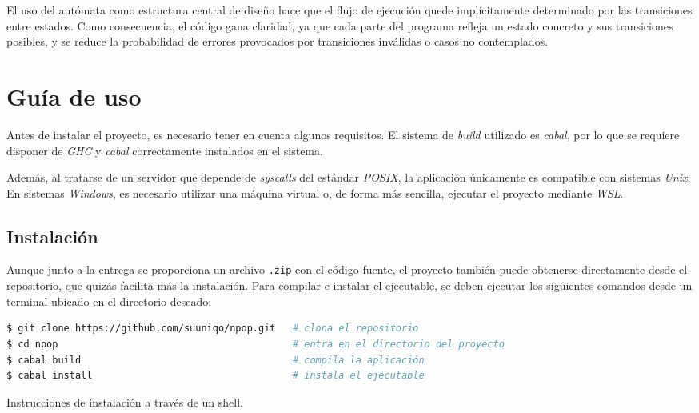 \documentclass[a4paper]{CSMakotoTechnicalReport}
\begin{document}
\vspace{10pt}

El uso del autómata como estructura central de diseño hace que el flujo de ejecución quede implícitamente determinado por las transiciones entre estados. Como consecuencia, el código gana claridad, ya que cada parte del programa refleja un estado concreto y sus transiciones posibles, y se reduce la probabilidad de errores provocados por transiciones inválidas o casos no contemplados.


\section{Guía de uso}

Antes de instalar el proyecto, es necesario tener en cuenta algunos requisitos. El sistema de \textit{build} utilizado es \textit{cabal}, por lo que se requiere disponer de \textit{GHC} y \textit{cabal} correctamente instalados en el sistema.

Además, al tratarse de un servidor que depende de \textit{syscalls} del estándar \textit{POSIX}, la aplicación únicamente es compatible con sistemas \textit{Unix}. En sistemas \textit{Windows}, es necesario utilizar una máquina virtual o, de forma más sencilla, ejecutar el proyecto mediante \textit{WSL}.


\subsection{Instalación}

Aunque junto a la entrega se proporciona un archivo \texttt{.zip} con el código fuente, el proyecto también puede obtenerse directamente desde el repositorio, que quizás facilita más la instalación. Para compilar e instalar el ejecutable, se deben ejecutar los siguientes comandos desde un terminal ubicado en el directorio deseado:

\vspace{-6pt}
\begin{minipage}{\linewidth}
\begin{lstlisting}[language=bash, numbers=none, basicstyle=\small]
$ git clone https://github.com/suuniqo/npop.git   # clona el repositorio
$ cd npop                                         # entra en el directorio del proyecto
$ cabal build                                     # compila la aplicación
$ cabal install                                   # instala el ejecutable
\end{lstlisting}
\captionsetup{type=lstlisting}
\caption{Instrucciones de instalación a través de un shell.}
\end{minipage}
\vspace{4pt}
\end{document}
